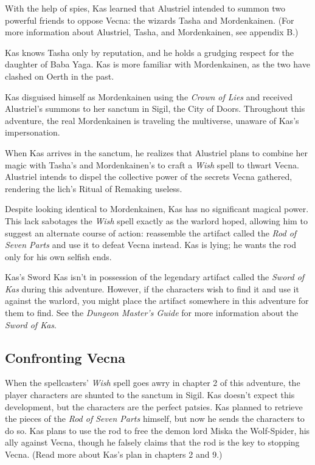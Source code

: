 \documentclass[10pt,a4paper,twoside,bg=print,twocolumn,openany,nodeprecatedcode]{dndbook}
\begin{document}
With the help of spies, Kas learned that Alustriel intended to summon two powerful friends to oppose Vecna: the wizards Tasha and Mordenkainen. (For more information about Alustriel, Tasha, and Mordenkainen, see appendix B.)

Kas knows Tasha only by reputation, and he holds a grudging respect for the daughter of Baba Yaga. Kas is more familiar with Mordenkainen, as the two have clashed on Oerth in the past.

Kas disguised himself as Mordenkainen using the \textit{Crown of Lies} and received Alustriel's summons to her sanctum in Sigil, the City of Doors. Throughout this adventure, the real Mordenkainen is traveling the multiverse, unaware of Kas's impersonation.

When Kas arrives in the sanctum, he realizes that Alustriel plans to combine her magic with Tasha's and Mordenkainen's to craft a \textit{Wish} spell to thwart Vecna. Alustriel intends to dispel the collective power of the secrets Vecna gathered, rendering the lich's Ritual of Remaking useless.

Despite looking identical to Mordenkainen, Kas has no significant magical power. This lack sabotages the \textit{Wish} spell exactly as the warlord hoped, allowing him to suggest an alternate course of action: reassemble the artifact called the \textit{Rod of Seven Parts} and use it to defeat Vecna instead. Kas is lying; he wants the rod only for his own selfish ends.

\begin{DndSidebar}[float=!b]{Kas's Sword}
Kas isn't in possession of the legendary artifact called the \textit{Sword of Kas} during this adventure. However, if the characters wish to find it and use it against the warlord, you might place the artifact somewhere in this adventure for them to find. See the \textit{Dungeon Master's Guide} for more information about the \textit{Sword of Kas}.



\end{DndSidebar}

\subsection{Confronting Vecna}
When the spellcasters' \textit{Wish} spell goes awry in chapter 2 of this adventure, the player characters are shunted to the sanctum in Sigil. Kas doesn't expect this development, but the characters are the perfect patsies. Kas planned to retrieve the pieces of the \textit{Rod of Seven Parts} himself, but now he sends the characters to do so. Kas plans to use the rod to free the demon lord Miska the Wolf-Spider, his ally against Vecna, though he falsely claims that the rod is the key to stopping Vecna. (Read more about Kas's plan in chapters 2 and 9.)
\end{document}
